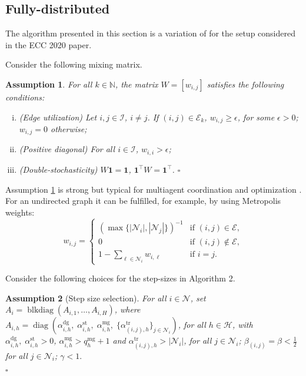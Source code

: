 \documentclass[10pt]{article}
\newtheorem{assumption}{Assumption}{\it}{}
\newcommand{\mc}{\mathcal}
\newcommand{\bb}{\mathbb}
\newcommand{\diag}{\operatorname{diag}}
\newcommand{\blkdiag}{\operatorname{blkdiag}}
\newcommand{\0}{\mathbf{0}}
\newcommand{\1}{\mathbf{1}}
\begin{document}
\newpage
\subsection{Fully-distributed}

The algorithm presented in this section is a variation of \cite[Alg. 3]{belgioioso2019distributed} for the setup considered in the ECC 2020 paper.

Consider the following mixing matrix.
\begin{assumption} \label{ass:DSMM}
For all $k \in \bb N$, the matrix $W=[w_{i,j}] $ satisfies the following conditions:
\begin{enumerate}[(i)]
\item (Edge utilization) Let $i,j \in \mc I$, $i \neq j$. If $(i,j) \in \mc E_k$, $w_{i,j} \geq \epsilon$, for some $\epsilon > 0$; $w_{i,j} = 0$ otherwise;
\item (Positive diagonal) For all $i \in \mc I$, $w_{i,i} > \epsilon$;
\item (Double-stochasticity) $W \1 = \1$, $\1^\top W = \1^\top$.
{\hfill $\square$}
\end{enumerate}
\end{assumption}

\smallskip
Assumption \ref{ass:DSMM} is strong but typical for multiagent coordination and optimization \cite{margellos2018distributed}. For an undirected graph it can be fulfilled, for example, by using Metropolis weights:
\begin{equation} \label{eq:Metropolis}
w_{i,j}=
\begin{cases}
(\max\{|\mc N_i|, |\mc N_j| \})^{-1} & \text{if } (i,j) \in \mc E,\\
0 & \text{if } (i,j) \not\in \mc E, %
\\
1- \sum_{\ell \in \mc N_i} w_{i,\ell} & \text{if } i=j.
\end{cases}
\end{equation}

\medskip

Consider the following choices for the step-sizes in Algorithm 2.

\begin{assumption}[Step size selection]\label{ass:SS-choiceFD}
For all $i \in \mc N$, set $A_i = \blkdiag(  A_{i,1},\ldots, A_{i,H})$, where $A_{i,h} = \diag \left(
\alpha_{i,h}^{\mathrm{dg}},  \; \alpha_{i,h}^{\mathrm{st}},\;  \alpha_{i,h}^{\mathrm{mg}}, \; \{ \alpha_{(i,j),h}^{\mathrm{tr}} \}_{j\in\mathcal{N}_i} \right)$, for all $ h \in \mc H$, with $\alpha_{i,h}^{\mathrm{dg}}, \; \alpha_{i,h}^{\mathrm{st}}>0$, $\alpha_{i,h}^{\text{mg}} > q_{h}^{\text{mg}} + 1$ and $\alpha_{(i,j),h}^{\mathrm{tr}} > |\mc N_i|$, for all $ j \in \mc N_i$; $\beta_{(i,j)} = \beta < \frac{1}{2}$ for all $j \in \mc N_i $; $\gamma < 1.$

{\hfill $\square$}
\end{assumption}
\end{document}
